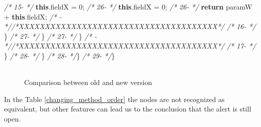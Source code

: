 \documentclass[
]{article}
\newenvironment{Shaded}{\begin{snugshade}}{\end{snugshade}}
\newcommand{\CommentTok}[1]{\textcolor[rgb]{0.56,0.35,0.01}{\textit{#1}}}
\newcommand{\DecValTok}[1]{\textcolor[rgb]{0.00,0.00,0.81}{#1}}
\newcommand{\FunctionTok}[1]{\textcolor[rgb]{0.00,0.00,0.00}{#1}}
\newcommand{\KeywordTok}[1]{\textcolor[rgb]{0.13,0.29,0.53}{\textbf{#1}}}
\newcommand{\NormalTok}[1]{#1}
\begin{document}
\begin{landscape}
\begin{Shaded}
\begin{Highlighting}[]
\CommentTok{/* 15-                 */}            \KeywordTok{this}\NormalTok{.}\FunctionTok{fieldX}\NormalTok{ = }\DecValTok{0}\NormalTok{;                                   }\CommentTok{/* 26-                 */}            \KeywordTok{this}\NormalTok{.}\FunctionTok{fieldX}\NormalTok{ = }\DecValTok{0}\NormalTok{;                                   }
\CommentTok{/* 26-                 */}        \KeywordTok{return}\NormalTok{ paramW + }\KeywordTok{this}\NormalTok{.}\FunctionTok{fieldX}\NormalTok{;                           }\CommentTok{/*   -                 *//*XXXXXXXXXXXXXXXXXXXXXXXXXXXXXXXXXXXXXX*/}                     
\CommentTok{/* 16-                 */}\NormalTok{        \}                                                      }\CommentTok{/* 27-                 */}\NormalTok{        \}                                                      }
\CommentTok{/* 27-                 */}\NormalTok{     \}                                                         }\CommentTok{/*   -                 *//*XXXXXXXXXXXXXXXXXXXXXXXXXXXXXXXXXXXXXX*/}                     
\CommentTok{/* 17-                 */}\NormalTok{    \}                                                          }\CommentTok{/* 28-                 */}\NormalTok{    \}                                                          }
\CommentTok{/* 28-                 */}\NormalTok{\}                                                              }\CommentTok{/* 29-                 */}\NormalTok{\}                                                              }
\end{Highlighting}
\end{Shaded}

\normalsize

\begin{figure}
\centering
\includegraphics{figures/fake.png}
\caption{Comparison between old and new version
\label{comparison_changing_method_order}}
\end{figure}

\end{landscape}

\newpage

In the Table \ref{changing_method_order} the nodes are not recognized as
equivalent, but other features can lead us to the conclusion that the
alert is still open.

\small
\end{document}
